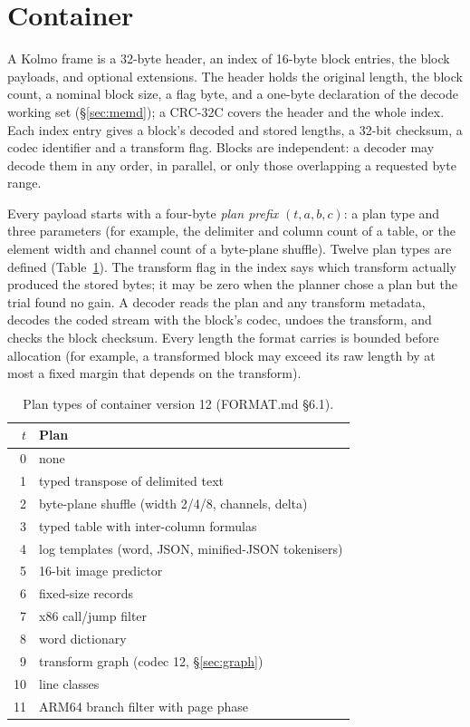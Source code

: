 \documentclass[conference]{IEEEtran}
\begin{document}
\section{Container}\label{sec:container}

A Kolmo frame is a 32-byte header, an index of 16-byte block entries, the block payloads, and optional extensions.
The header holds the original length, the block count, a nominal block size, a flag byte, and a one-byte
declaration of the decode working set (\S\ref{sec:memd}); a CRC-32C covers the header and the whole index. Each
index entry gives a block's decoded and stored lengths, a 32-bit checksum, a codec identifier and a transform flag.
Blocks are independent: a decoder may decode them in any order, in parallel, or only those overlapping a requested
byte range.

Every payload starts with a four-byte \emph{plan prefix} $(t,a,b,c)$: a plan type and three parameters (for example,
the delimiter and column count of a table, or the element width and channel count of a byte-plane shuffle). Twelve
plan types are defined (Table~\ref{tab:plans}). The transform flag in the index says which transform actually
produced the stored bytes; it may be zero when the planner chose a plan but the trial found no gain. A decoder reads
the plan and any transform metadata, decodes the coded stream with the block's codec, undoes the transform, and
checks the block checksum. Every length the format carries is bounded before allocation (for example, a transformed
block may exceed its raw length by at most a fixed margin that depends on the transform).

\begin{table}[t]
\caption{Plan types of container version 12 (FORMAT.md \S6.1).}\label{tab:plans}
\centering\footnotesize
\begin{tabular}{@{}rl@{}}
\toprule
$t$ & Plan \\ \midrule
0 & none \\
1 & typed transpose of delimited text \\
2 & byte-plane shuffle (width 2/4/8, channels, delta) \\
3 & typed table with inter-column formulas \\
4 & log templates (word, JSON, minified-JSON tokenisers) \\
5 & 16-bit image predictor \\
6 & fixed-size records \\
7 & x86 call/jump filter \\
8 & word dictionary \\
9 & transform graph (codec 12, \S\ref{sec:graph}) \\
10 & line classes \\
11 & ARM64 branch filter with page phase \\
\bottomrule
\end{tabular}
\end{table}
\end{document}
